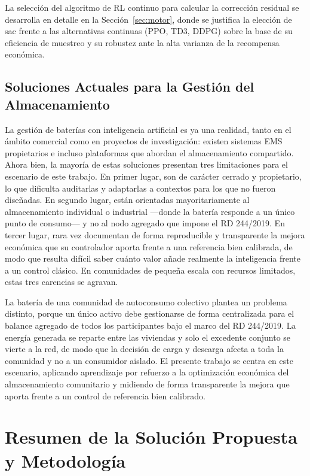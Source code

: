 \documentclass[12pt, a4paper, twoside]{report}
\begin{document}
La selección del algoritmo de RL continuo para calcular la corrección residual
se desarrolla en detalle en la Sección~\ref{sec:motor}, donde se justifica la
elección de \acrshort{sac} frente a las alternativas continuas (PPO, TD3, DDPG)
sobre la base de su eficiencia de muestreo y su robustez ante la alta varianza
de la recompensa económica.

\section{Soluciones Actuales para la Gestión del Almacenamiento}

La gestión de baterías con inteligencia artificial es ya una realidad, tanto en
el ámbito comercial como en proyectos de investigación: existen sistemas EMS
propietarios e incluso plataformas que abordan el almacenamiento compartido.
Ahora bien, la mayoría de estas soluciones presentan tres limitaciones para el
escenario de este trabajo. En primer lugar, son de carácter cerrado y
propietario, lo que dificulta auditarlas y adaptarlas a contextos para los que
no fueron diseñadas. En segundo lugar, están orientadas mayoritariamente al
almacenamiento individual o industrial —donde la batería responde a un único
punto de consumo— y no al nodo agregado que impone el RD 244/2019. En tercer
lugar, rara vez documentan de forma reproducible y transparente la mejora
económica que su controlador aporta frente a una referencia bien calibrada, de
modo que resulta difícil saber cuánto valor añade realmente la inteligencia
frente a un control clásico. En comunidades de pequeña escala con recursos
limitados, estas tres carencias se agravan.

La batería de una comunidad de autoconsumo colectivo plantea un problema
distinto, porque un único activo debe gestionarse de forma centralizada para el
balance agregado de todos los participantes bajo el marco del RD 244/2019. La
energía generada se reparte entre las viviendas y solo el excedente conjunto se
vierte a la red, de modo que la decisión de carga y descarga afecta a toda la
comunidad y no a un consumidor aislado. El presente trabajo se centra en este
escenario, aplicando aprendizaje por refuerzo a la optimización económica del
almacenamiento comunitario y midiendo de forma transparente la mejora que aporta
frente a un control de referencia bien calibrado.

\chapter{Resumen de la Solución Propuesta y Metodología}
\label{chap:solucion}
\end{document}
